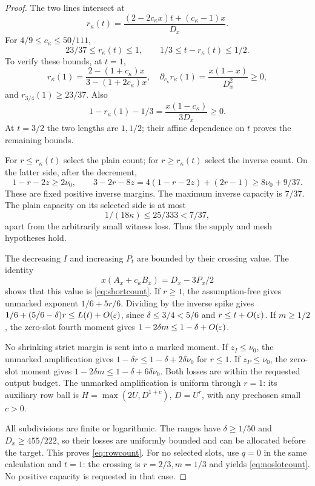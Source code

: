\begin{proof}
The two lines intersect at
\begin{equation}\label{eq:crossing}
 r_\kappa(t)=\frac{(2-2c_\kappa x)t+(c_\kappa-1)x}{D_x}.
\end{equation}
For $4/9\le c_\kappa\le50/111$,
\begin{equation}\label{eq:lengthbounds}
 23/37\le r_\kappa(t)\le1,\qquad 1/3\le t-r_\kappa(t)\le1/2.
\end{equation}
To verify these bounds, at $t=1$,
\[
 r_\kappa(1)=\frac{2-(1+c_\kappa)x}{3-(1+2c_\kappa)x},\quad
 \partial_{c_\kappa}r_\kappa(1)=\frac{x(1-x)}{D_x^2}\ge0,
\]
and $r_{3/4}(1)\ge23/37$. Also
\[
 1-r_\kappa(1)-1/3=\frac{x(1-c_\kappa)}{3D_x}\ge0.
\]
At $t=3/2$ the two lengths are $1,1/2$; their affine dependence on $t$ proves the remaining bounds.

For $r\le r_\kappa(t)$ select the plain count; for $r\ge r_\kappa(t)$ select the inverse count. On the latter side, after the decrement,
\[
 1-r-2z\ge2\nu_0,\qquad
 3-2r-8z=4(1-r-2z)+(2r-1)\ge8\nu_0+9/37.
\]
These are fixed positive inverse margins. The maximum inverse capacity is $7/37$. The plain capacity on its selected side is at most
\[
 1/(18\kappa)\le25/333<7/37,
\]
apart from the arbitrarily small witness loss. Thus the supply and mesh hypotheses hold.

The decreasing $I$ and increasing $P_t$ are bounded by their crossing value. The identity
\[
 x(A_x+c_\kappa B_x)=D_x-3P_x/2
\]
shows that this value is \eqref{eq:shortcount}. If $r\ge1$, the assumption-free  gives unmarked exponent $1/6+5r/6$. Dividing by the inverse spike gives $1/6+(5/6-\delta)r\le L(t)+O(\varepsilon)$, since $\delta\le3/4<5/6$ and $r\le t+O(\varepsilon)$. If $m\ge1/2$, the zero-slot fourth moment gives $1-2\delta m\le1-\delta+O(\varepsilon)$.

No shrinking strict margin is sent into a marked moment. If $z_I\le\nu_0$, the unmarked amplification gives $1-\delta r\le1-\delta+2\delta\nu_0$ for $r\le1$. If $z_P\le\nu_0$, the zero-slot moment gives $1-2\delta m\le1-\delta+6\delta\nu_0$. Both losses are within the requested output budget. The unmarked amplification is uniform through $r=1$: its auxiliary row ball is $H=\max(2U,D^{1+c})$, $D=U^r$, with any prechosen small $c>0$.

All subdivisions are finite or logarithmic. The ranges have $\delta\ge1/50$ and $D_x\ge455/222$, so their losses are uniformly bounded and can be allocated before the target. This proves \eqref{eq:rowcount}. For no selected slots, use $q=0$ in the same calculation and $t=1$: the crossing is $r=2/3,m=1/3$ and yields \eqref{eq:noslotcount}. No positive capacity is requested in that case.
\end{proof}

